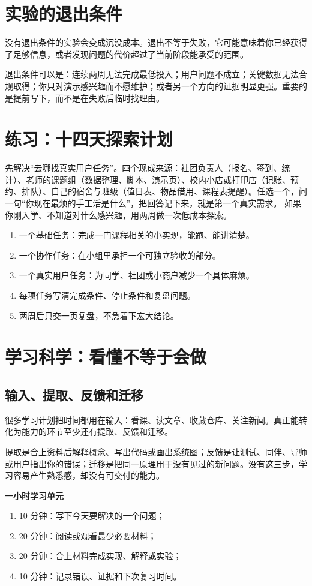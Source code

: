 \documentclass[UTF8,zihao=5,openany]{ctexbook}
\begin{document}
\section{实验的退出条件}
没有退出条件的实验会变成沉没成本。退出不等于失败，它可能意味着你已经获得了足够信息，或者发现问题的代价超过了当前阶段能承受的范围。

退出条件可以是：连续两周无法完成最低投入；用户问题不成立；关键数据无法合规取得；你只对演示感兴趣而不愿维护；或者另一个方向的证据明显更强。重要的是提前写下，而不是在失败后临时找理由。

\section{练习：十四天探索计划}

先解决“去哪找真实用户任务”。四个现成来源：社团负责人（报名、签到、统计）、老师的课题组（数据整理、脚本、演示页）、校内小店或打印店（记账、预约、排队）、自己的宿舍与班级（值日表、物品借用、课程表提醒）。任选一个，问一句“你现在最烦的手工活是什么”，把回答记下来，就是第一个真实需求。
如果你刚入学、不知道对什么感兴趣，用两周做一次低成本探索。

\begin{enumerate}
\item 一个基础任务：完成一门课程相关的小实现，能跑、能讲清楚。
\item 一个协作任务：在小组里承担一个可独立验收的部分。
\item 一个真实用户任务：为同学、社团或小商户减少一个具体麻烦。
\item 每项任务写清完成条件、停止条件和复盘问题。
\item 两周后只交一页复盘，不急着下宏大结论。
\end{enumerate}

\section{学习科学：看懂不等于会做}
\subsection{输入、提取、反馈和迁移}
很多学习计划把时间都用在输入：看课、读文章、收藏仓库、关注新闻。真正能转化为能力的环节至少还有提取、反馈和迁移。

提取是合上资料后解释概念、写出代码或画出系统图；反馈是让测试、同伴、导师或用户指出你的错误；迁移是把同一原理用于没有见过的新问题。没有这三步，学习容易产生熟悉感，却没有可交付的能力。

\begin{toolbox}
\textbf{一小时学习单元}
\begin{enumerate}
\item 10 分钟：写下今天要解决的一个问题；
\item 20 分钟：阅读或观看最少必要材料；
\item 20 分钟：合上材料完成实现、解释或实验；
\item 10 分钟：记录错误、证据和下次复习时间。
\end{enumerate}
\end{toolbox}
\end{document}
